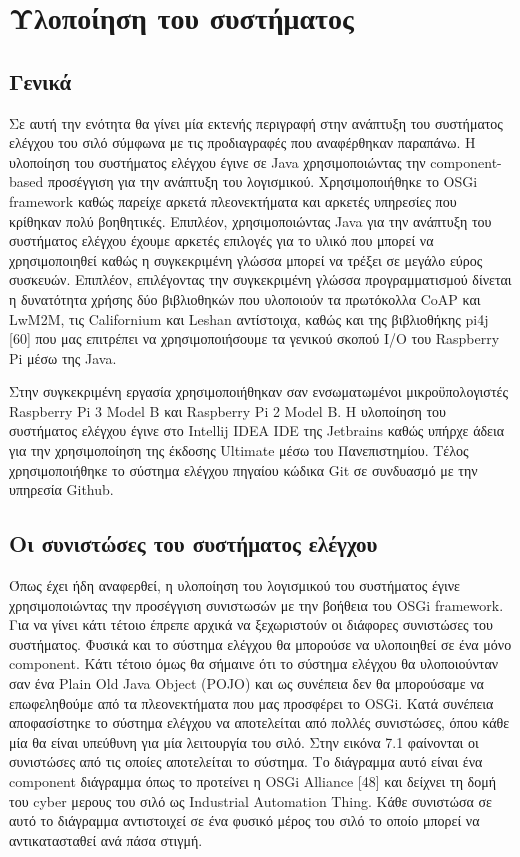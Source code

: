 \chapter{Υλοποίηση του συστήματος} %

\label{Chapter7} 

\section{Γενικά}
 Σε αυτή την ενότητα θα γίνει μία εκτενής περιγραφή στην ανάπτυξη του συστήματος ελέγχου του σιλό σύμφωνα με τις προδιαγραφές που αναφέρθηκαν παραπάνω. Η υλοποίηση του συστήματος ελέγχου έγινε σε Java χρησιμοποιώντας την component-based προσέγγιση για την ανάπτυξη του λογισμικού. Χρησιμοποιήθηκε το OSGi framework καθώς παρείχε αρκετά πλεονεκτήματα και αρκετές υπηρεσίες που κρίθηκαν πολύ βοηθητικές. Επιπλέον, χρησιμοποιώντας Java για την ανάπτυξη του συστήματος ελέγχου έχουμε αρκετές επιλογές για το υλικό που μπορεί να χρησιμοποιηθεί καθώς η συγκεκριμένη γλώσσα μπορεί να τρέξει σε μεγάλο εύρος συσκευών. Επιπλέον, επιλέγοντας την συγκεκριμένη γλώσσα προγραμματισμού δίνεται η δυνατότητα χρήσης δύο βιβλιοθηκών που υλοποιούν τα πρωτόκολλα CoAP και LwM2M, τις Californium και Leshan αντίστοιχα, καθώς και της βιβλιοθήκης pi4j [60] που μας επιτρέπει να χρησιμοποιήσουμε τα γενικού σκοπού I/O του Raspberry Pi μέσω της Java. 

	Στην συγκεκριμένη εργασία χρησιμοποιήθηκαν σαν ενσωματωμένοι μικροϋπολογιστές  Raspberry Pi 3 Model B και Raspberry Pi 2 Model B.  Η υλοποίηση του συστήματος ελέγχου έγινε στο Intellij IDEA IDE της Jetbrains καθώς υπήρχε άδεια για την χρησιμοποίηση της έκδοσης  Ultimate μέσω του Πανεπιστημίου. Tέλος χρησιμοποιήθηκε το σύστημα ελέγχου πηγαίου κώδικα Git σε συνδυασμό με την υπηρεσία Github. 
	
\section{Οι συνιστώσες του συστήματος ελέγχου}
Όπως έχει ήδη αναφερθεί, η υλοποίηση του λογισμικού του συστήματος έγινε χρησιμοποιώντας την προσέγγιση συνιστωσών με την βοήθεια του OSGi framework. Για να γίνει κάτι τέτοιο έπρεπε αρχικά να ξεχωριστούν οι διάφορες συνιστώσες του συστήματος. Φυσικά και το σύστημα ελέγχου θα μπορούσε να υλοποιηθεί σε ένα μόνο component. Κάτι τέτοιο όμως θα σήμαινε ότι το σύστημα ελέγχου θα υλοποιούνταν σαν ένα Plain Old Java Object (POJO) και ως συνέπεια δεν θα μπορούσαμε να επωφεληθούμε από τα πλεονεκτήματα που μας προσφέρει το OSGi. Κατά συνέπεια αποφασίστηκε το σύστημα ελέγχου να αποτελείται από πολλές συνιστώσες, όπου κάθε μία θα είναι υπεύθυνη για μία λειτουργία του σιλό. Στην εικόνα 7.1 φαίνονται οι συνιστώσες από τις οποίες αποτελείται το σύστημα. Το διάγραμμα αυτό είναι ένα component διάγραμμα όπως το προτείνει η OSGi Alliance [48] και δείχνει τη δομή του cyber μερους του σιλό ως Industrial Automation Thing. Κάθε συνιστώσα σε αυτό το διάγραμμα αντιστοιχεί σε ένα φυσικό μέρος του σιλό το οποίο μπορεί να αντικατασταθεί ανά πάσα στιγμή. 

